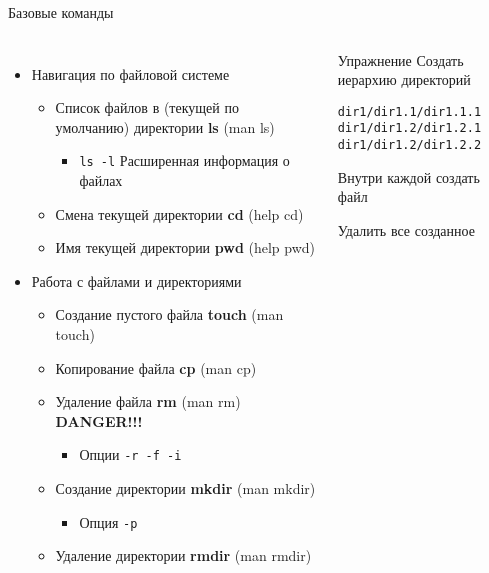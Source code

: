 \documentclass[ignorenonframetext, professionalfonts, hyperref={pdftex, unicode}]{beamer}
\begin{document}
\begin{frame}[fragile]{Базовые команды}
\begin{columns}
  \begin{itemize}
    \item Навигация по файловой системе
      \begin{itemize}
        \item Список файлов в (текущей по умолчанию) директории \pause \textbf{ls} (man ls)
          \begin{itemize}
            \item {\tt ls -l} Расширенная информация о файлах
          \end{itemize}
        \pause
        \item Смена текущей директории \pause \textbf{cd} (help cd)
        \item Имя текущей директории \pause \textbf{pwd} (help pwd)
      \end{itemize}
      \pause
    \item Работа с файлами и директориями
      \begin{itemize}
        \item Создание пустого файла \textbf{touch} (man touch)
        \item Копирование файла \textbf{cp} (man cp)
        \item Удаление файла \textbf{rm} (man rm) \textbf{DANGER!!!}
          \begin{itemize}
            \item Опции {\tt -r -f -i}  
          \end{itemize}
        \item Создание директории \textbf{mkdir} (man mkdir)
            \begin{itemize}
              \item Опция {\tt -p}
            \end{itemize}
        \item Удаление директории \textbf{rmdir} (man rmdir)
      \end{itemize}
  \end{itemize}
   \begin{block}{Упражнение}
     Создать иерархию директорий
\begin{lstlisting}
dir1/dir1.1/dir1.1.1
dir1/dir1.2/dir1.2.1
dir1/dir1.2/dir1.2.2
\end{lstlisting}

Внутри каждой создать файл

Удалить все созданное
   \end{block}
 \end{columns}
\end{frame}
\end{document}
